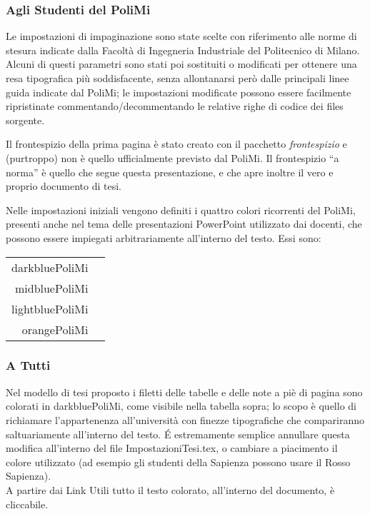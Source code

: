 \subsubsection{Agli Studenti del PoliMi}
Le impostazioni di impaginazione sono state scelte con riferimento alle norme di stesura indicate dalla Facoltà di Ingegneria Industriale del Politecnico di Milano. Alcuni di questi parametri sono stati poi sostituiti o modificati per ottenere una resa tipografica più soddisfacente, senza allontanarsi però dalle principali linee guida indicate dal PoliMi; le impostazioni modificate possono essere facilmente ripristinate commentando/decommentando le relative righe di codice dei files sorgente.
%
\par Il frontespizio della prima pagina è stato creato con il pacchetto \emph{frontespizio} e (purtroppo) non è quello ufficialmente previsto dal PoliMi. Il frontespizio ``a norma'' è quello che segue questa presentazione, e che apre inoltre il vero e proprio documento di tesi.
%
\par Nelle impostazioni iniziali vengono definiti i quattro colori ricorrenti del PoliMi, presenti anche nel tema delle presentazioni PowerPoint utilizzato dai docenti, che possono essere impiegati arbitrariamente all'interno del testo. Essi sono:
%
\begin{center}
\begin{tabular}{rc}
%
\toprule
%
darkbluePoliMi	& \cellcolor{darkbluePoliMi}\\
midbluePoliMi	& \cellcolor{midbluePoliMi}\\
lightbluePoliMi	& \cellcolor{lightbluePoliMi}\\
orangePoliMi	& \cellcolor{orangePoliMi}\\
%
\bottomrule
%
\end{tabular}
\end{center}
%
\subsubsection{A Tutti}
Nel modello di tesi proposto i filetti delle tabelle e delle note a piè di pagina sono colorati in {\color{darkbluePoliMi} darkbluePoliMi}, come visibile nella tabella sopra; lo scopo è quello di richiamare l'appartenenza all'università con finezze tipografiche che compariranno saltuariamente all'interno del testo. \'E estremamente semplice annullare questa modifica all'interno del file ImpostazioniTesi.tex, o cambiare a piacimento il colore utilizzato (ad esempio gli studenti della Sapienza possono usare il {\color{redSapienza} Rosso Sapienza}).
%
\\A partire dai Link Utili tutto il testo colorato, all'interno del documento, è cliccabile.
%
%
